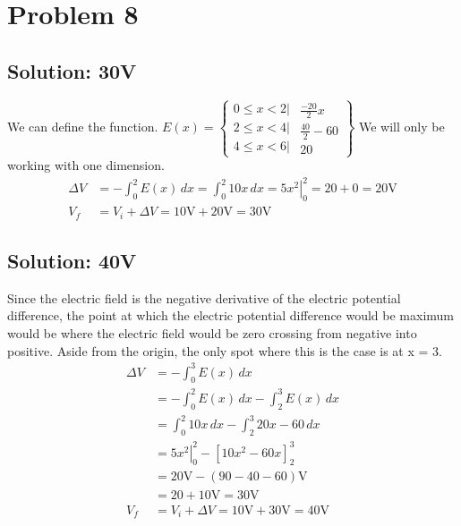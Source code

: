 \documentclass[12pt]{article}
\begin{document}
\section{Problem 8}
\subsection{Solution: 30V}
We can define the function. 
\(E(x) = \left\{ \begin{matrix}
    0 \le x < 2| \\
    2 \le x < 4| \\
    4 \le x < 6| 
\end{matrix}
\begin{matrix}
    \frac{-20}{2}x\\
    \frac{40}{2} - 60\\
    20
\end{matrix} \right\}\)
We will only be working with one dimension.
\begin{align*}
    \Delta V &= -\int_{0}^{2} E(x)\,dx
        =   \int_0^2 10x\,dx
        =   \left. 5x^2 \right|_0^2
        =   20 + 0
        =   20 \unit{\volt}\\
    V_f &=  V_i + \Delta V
        =   10 \unit{\volt} + 20 \unit{\volt}
        =   \boxed{30 \unit{\volt}}
\end{align*}

\subsection{Solution: 40V}
Since the electric field is the negative derivative of the electric potential difference, the point at which the electric potential difference would be maximum would be where the electric field would be zero crossing from negative into positive. 
Aside from the origin, the only spot where this is the case is at x = 3.
\begin{align*}
    \Delta V &= -\int_{0}^{3} E(x)\,dx\\
        &=  -\int_{0}^{2} E(x)\,dx - \int_{2}^{3} E(x)\,dx\\
        &=  \int_{0}^{2} 10x\,dx - \int_{2}^{3} 20x - 60\,dx\\
        &=  \left. 5x^2 \right|_0^2 - \left[ 10x^2 - 60x \right]_2^3\\
        &=  20 \unit{\volt} - (90 - 40 - 60) \unit{\volt}\\
        &=  20 + 10 \unit{\volt}
        =   30 \unit{\volt}\\
        V_f &=  V_i + \Delta V
        =   10 \unit{\volt} + 30 \unit{\volt}
        =   \boxed{40 \unit{\volt}}
\end{align*}
\end{document}
